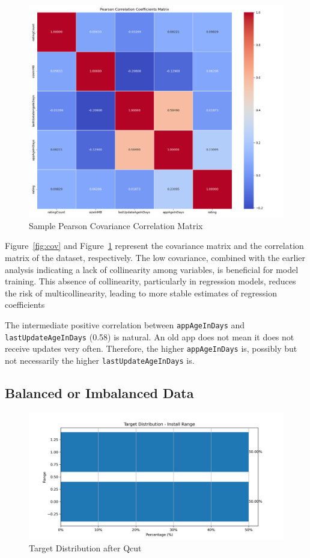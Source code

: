 \begin{figure}[h]
    \centering
    \includegraphics[width=\textwidth]{docs//assets/cor.png}
    \caption{Sample Pearson Covariance Correlation Matrix}
    \label{fig:cor}
\end{figure}

Figure~\ref{fig:cov} and Figure~\ref{fig:cor} represent the covariance matrix and the correlation matrix of the dataset, respectively. The low covariance, combined with the earlier analysis indicating a lack of collinearity among variables, is beneficial for model training. This absence of collinearity, particularly in regression models, reduces the risk of multicollinearity, leading to more stable estimates of regression coefficients

The intermediate positive correlation between \texttt{appAgeInDays} and \texttt{lastUpdateAgeInDays} (0.58) is natural. An old app does not mean it does not receive updates very often. Therefore, the higher \texttt{appAgeInDays} is, possibly but not necessarily the higher \texttt{lastUpdateAgeInDays} is.

\subsection{Balanced or Imbalanced Data}

\begin{figure}
    \centering
    \includegraphics[width=1\linewidth]{docs//assets/target_low_high.png}
    \caption{Target Distribution after Qcut}
    \label{fig:target}
\end{figure}

